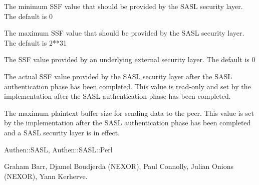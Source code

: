 \documentclass[]{article}
\begin{document}
\begin{description}
\itemsep1pt\parskip0pt
\item[minssf]
The minimum SSF value that should be provided by the SASL security
layer. The default is 0
\end{description}

\begin{description}
\itemsep1pt\parskip0pt
\item[maxssf]
The maximum SSF value that should be provided by the SASL security
layer. The default is 2**31
\end{description}

\begin{description}
\itemsep1pt\parskip0pt
\item[externalssf]
The SSF value provided by an underlying external security layer. The
default is 0
\end{description}

\begin{description}
\itemsep1pt\parskip0pt
\item[ssf]
The actual SSF value provided by the SASL security layer after the SASL
authentication phase has been completed. This value is read-only and set
by the implementation after the SASL authentication phase has been
completed.
\end{description}

\begin{description}
\itemsep1pt\parskip0pt
\item[maxout]
The maximum plaintext buffer size for sending data to the peer. This
value is set by the implementation after the SASL authentication phase
has been completed and a SASL security layer is in effect.
\end{description}


Authen::SASL, Authen::SASL::Perl


Graham Barr, Djamel Boudjerda (NEXOR), Paul Connolly, Julian Onions
(NEXOR), Yann Kerherve.
\end{document}
